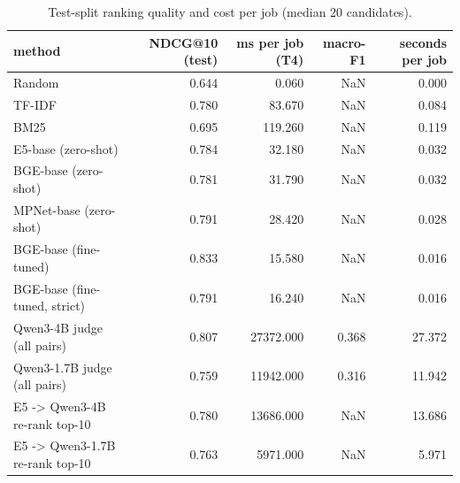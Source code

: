 \begin{table}
\caption{Test-split ranking quality and cost per job (median 20 candidates).}
\label{tab:t5_llm_cost}
\begin{tabular}{lrrrr}
\toprule
method & NDCG@10 (test) & ms per job (T4) & macro-F1 & seconds per job \\
\midrule
Random & 0.644 & 0.060 & NaN & 0.000 \\
TF-IDF & 0.780 & 83.670 & NaN & 0.084 \\
BM25 & 0.695 & 119.260 & NaN & 0.119 \\
E5-base (zero-shot) & 0.784 & 32.180 & NaN & 0.032 \\
BGE-base (zero-shot) & 0.781 & 31.790 & NaN & 0.032 \\
MPNet-base (zero-shot) & 0.791 & 28.420 & NaN & 0.028 \\
BGE-base (fine-tuned) & 0.833 & 15.580 & NaN & 0.016 \\
BGE-base (fine-tuned, strict) & 0.791 & 16.240 & NaN & 0.016 \\
Qwen3-4B judge (all pairs) & 0.807 & 27372.000 & 0.368 & 27.372 \\
Qwen3-1.7B judge (all pairs) & 0.759 & 11942.000 & 0.316 & 11.942 \\
E5 -> Qwen3-4B re-rank top-10 & 0.780 & 13686.000 & NaN & 13.686 \\
E5 -> Qwen3-1.7B re-rank top-10 & 0.763 & 5971.000 & NaN & 5.971 \\
\bottomrule
\end{tabular}
\end{table}
